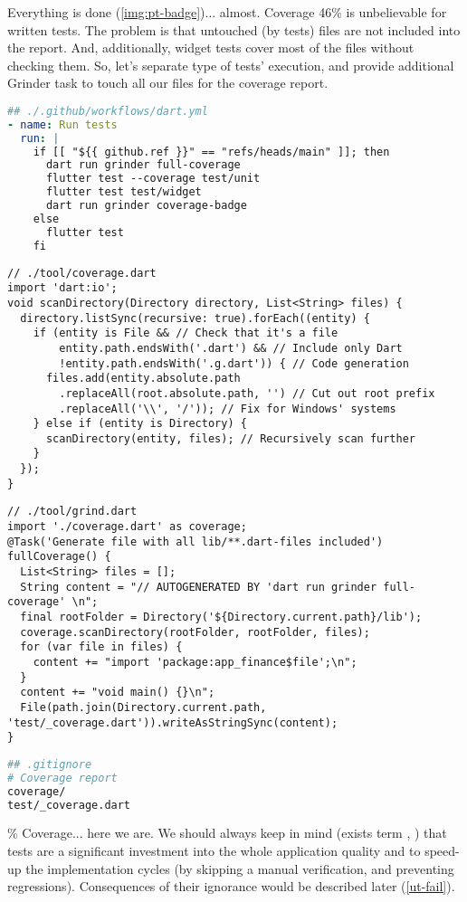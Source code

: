 
Everything is done (\cref{img:pt-badge})... almost. Coverage 46\% is unbelievable for written tests. The problem is 
that untouched (by tests) files are not included into the report. And, additionally, widget tests cover most of the 
files without checking them. So, let's separate type of tests' execution, and provide additional Grinder task to 
touch all our files for the coverage report.

\begin{lstlisting}[language=yaml]
## ./.github/workflows/dart.yml
- name: Run tests
  run: |
    if [[ "${{ github.ref }}" == "refs/heads/main" ]]; then
      dart run grinder full-coverage
      flutter test --coverage test/unit
      flutter test test/widget
      dart run grinder coverage-badge
    else
      flutter test
    fi
\end{lstlisting}

\begin{lstlisting}
// ./tool/coverage.dart
import 'dart:io';
void scanDirectory(Directory directory, List<String> files) {
  directory.listSync(recursive: true).forEach((entity) {
    if (entity is File && // Check that it's a file
        entity.path.endsWith('.dart') && // Include only Dart
        !entity.path.endsWith('.g.dart')) { // Code generation
      files.add(entity.absolute.path
        .replaceAll(root.absolute.path, '') // Cut out root prefix
        .replaceAll('\\', '/')); // Fix for Windows' systems
    } else if (entity is Directory) {
      scanDirectory(entity, files); // Recursively scan further
    }
  });
}
\end{lstlisting}

\begin{lstlisting}
// ./tool/grind.dart
import './coverage.dart' as coverage;
@Task('Generate file with all lib/**.dart-files included')
fullCoverage() {
  List<String> files = [];
  String content = "// AUTOGENERATED BY 'dart run grinder full-coverage' \n";
  final rootFolder = Directory('${Directory.current.path}/lib');
  coverage.scanDirectory(rootFolder, rootFolder, files);
  for (var file in files) {
    content += "import 'package:app_finance$file';\n";
  }
  content += "void main() {}\n";
  File(path.join(Directory.current.path, 'test/_coverage.dart')).writeAsStringSync(content);
}
\end{lstlisting}

\begin{lstlisting}[language=bash]
## .gitignore
# Coverage report
coverage/
test/_coverage.dart
\end{lstlisting}

\% Coverage... here we are. We should always keep in mind (exists term , \cite{Bjorn21}) 
that tests are a significant investment into the whole application quality and to speed-up the implementation cycles 
(by skipping a manual verification, and preventing regressions). Consequences of their ignorance would be described 
later (\ref{ut-fail}).
